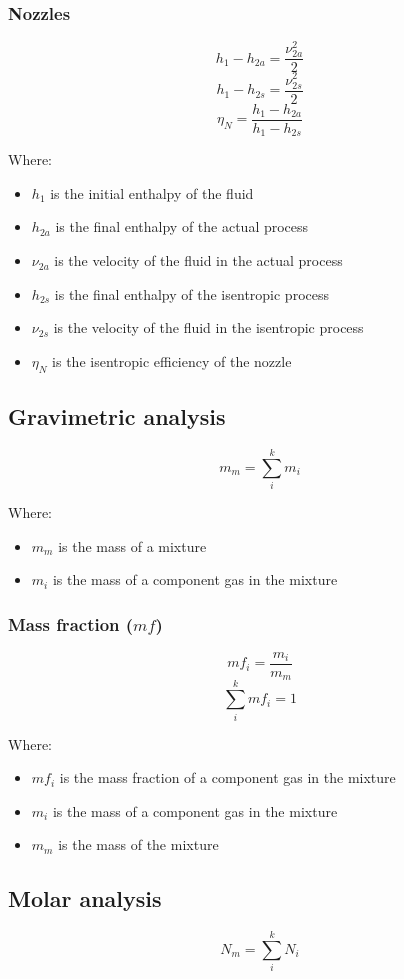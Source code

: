 \documentclass[11pt]{article}
\begin{document}
\subsubsection{Nozzles}
\label{sec:orgd5de2a3}
\[h_1 - h_{2a} = \frac{\nu^2_{2a}}{2}\]
\[h_1 - h_{2s} = \frac{\nu^2_{2s}}{2}\]
\[\eta_N = \frac{h_1 - h_{2a}}{h_1 - h_{2s}}\]

Where:
\begin{itemize}
\item \(h_1\) is the initial enthalpy of the fluid
\item \(h_{2a}\) is the final enthalpy of the actual process
\item \(\nu_{2a}\) is the velocity of the fluid in the actual process
\item \(h_{2s}\) is the final enthalpy of the isentropic process
\item \(\nu_{2s}\) is the velocity of the fluid in the isentropic process
\item \(\eta_N\) is the isentropic efficiency of the nozzle
\end{itemize}
\subsection{Gravimetric analysis}
\label{sec:orgff243d8}
\[m_m = \sum_i^k m_i\]

Where:
\begin{itemize}
\item \(m_m\) is the mass of a mixture
\item \(m_i\) is the mass of a component gas in the mixture
\end{itemize}
\subsubsection{Mass fraction (\(mf\))}
\label{sec:org6682747}
\[mf_i = \frac{m_i}{m_m}\]
\[\sum_i^k mf_i = 1\]

Where:
\begin{itemize}
\item \(mf_i\) is the mass fraction of a component gas in the mixture
\item \(m_i\) is the mass of a component gas in the mixture
\item \(m_m\) is the mass of the mixture
\end{itemize}
\subsection{Molar analysis}
\label{sec:orgfa4e66f}
\[N_m = \sum_i^k N_i\]
\end{document}
